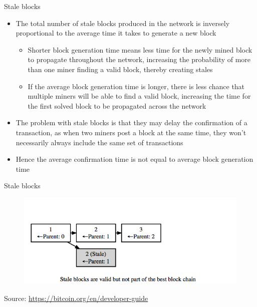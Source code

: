 \documentclass[10pt]{beamer}
\begin{document}
\begin{frame}{Stale blocks}
	\begin{itemize}
		\item The total number of stale blocks produced in the network is inversely proportional to the average time it takes to generate a new block
		\begin{itemize}
			\item Shorter block generation time means less time for the newly mined block to propagate throughout the network, increasing the probability of more than one miner finding a valid block, thereby creating stales
			\item If the average block generation time is longer, there is less chance that multiple miners will be able to find a valid block, increasing the time for the first solved block to be propagated across the network
		\end{itemize}
		\item The problem with stale blocks is that they may delay the confirmation of a transaction, as when two miners post a block at the same time, they won't necessarily always include the same set of transactions
		\item Hence the average confirmation time is not equal to average block generation time
	\end{itemize}
\end{frame}


\begin{frame}{Stale blocks}
	\begin{figure}[]
		\centering
		\includegraphics  [scale=0.4]{Images/stale}
	\end{figure}
	\begin{tiny}
		Source: \href{https://bitcoin.org/en/developer-guide}{https://bitcoin.org/en/developer-guide}
	\end{tiny}
\end{frame}
\end{document}
